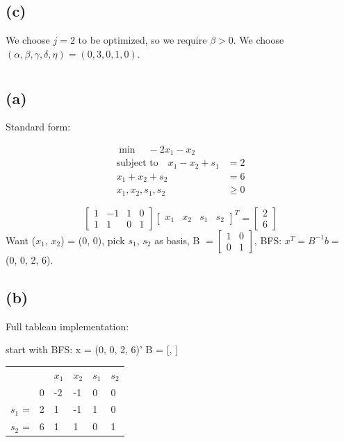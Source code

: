 \documentclass{article}
\newcommand{\1}{\bm 1}
\begin{document}
\subsection*{(c)}

We choose $j=2$ to be optimized, so we require $\beta>0$. We choose $(\alpha,\beta,\gamma,\delta,\eta)=(0, 3, 0, 1, 0)$.



\section{}

\subsection*{(a)}

Standard form:

\begin{align*}
    \min \quad  -2x_1 - x_2 & \\
    \text{subject to} \quad x_1 - x_2 + s_1 & = 2 \\
    x_1 + x_2 + s_2 & = 6 \\
    x_1, x_2, s_1, s_2 & \geq 0
\end{align*}

\[\begin{bmatrix}
    1 & -1 & 1 & 0 \\
    1 & 1 & 0 & 1
\end{bmatrix} \begin{bmatrix}
    x_1 & x_2 & s_1 & s_2
\end{bmatrix}^{T} = \begin{bmatrix}
    2 \\
    6
\end{bmatrix}
\]
Want ($x_1$, $x_2$) = (0, 0), pick $s_1$, $s_2$ as basis, 
B $ = \begin{bmatrix} 1 & 0 \\ 0 & 1 \end{bmatrix} $, 
BFS: $x^T = B ^{-1} b = $ (0, 0, 2, 6).

\subsection*{(b)}

Full tableau implementation:

start with BFS: x = (0, 0, 2, 6)'
B = [, ]

\begin{tabular}{l|l|l|l|l|l|}
\cline{2-6}
&  & $x_1$ & $x_2$ & $s_1$ & $s_2$ \\ \cline{2-6} 
& 0 & -2 & -1 & 0 & 0 \\ \cline{2-6} 
 $s_1$ = & 2 & 1 & -1 & 1 & 0 \\ \cline{2-6} 
 $s_2$ = & 6 & 1 & 1 & 0 & 1\\ \cline{2-6} 
\end{tabular}
\\
\end{document}
